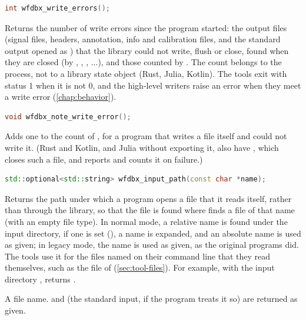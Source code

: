 \begin{lstlisting}[language=C++,style=signature]
int wfdbx_write_errors();
\end{lstlisting}
Returns the number of write errors since the program started: the output
files (signal files, headers, annotation, info and calibration files, and
the standard output opened as \code{-}) that the library could not write,
flush or close, found when they are closed (by ,
, , ...), and those counted by
. The count belongs to the process, not to a
library state object (Rust, Julia, Kotlin). The tools exit with status 1
when it is not 0, and the high-level writers raise an error when they meet a
write error (\cref{chap:behavior}).

\begin{lstlisting}[language=C++,style=signature]
void wfdbx_note_write_error();
\end{lstlisting}
Adds one to the count of , for a program that
writes a file itself and could not write it. (Rust and Kotlin, and Julia
without exporting it, also have , which closes such a file,
and reports  and counts it on failure.)

\begin{lstlisting}[language=C++,style=signature]
std::optional<std::string> wfdbx_input_path(const char *name);
\end{lstlisting}
Returns the path under which a program opens a file that it reads itself,
rather than through the library, so that the file is found where
 finds a file of that name (with an empty file type). In
normal mode, a relative name is found under the input directory, if one is
set (), a \code{\textasciitilde} name is
expanded, and an absolute name is used as given; in legacy mode, the name is
used as given, as the original programs did. The tools use it for the files
named on their command line that they read themselves, such as the 
file of  (\cref{sec:tool-files}). For example, with the input
directory ,  returns
.
\begin{params}
\item[name] A file name.  and  (the standard input, if the
  program treats it so) are returned as given.
\end{params}

